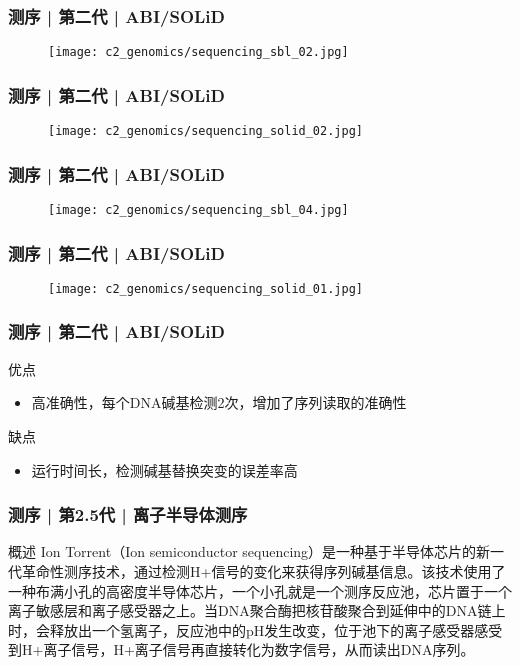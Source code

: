 \begin{frame}
  \frametitle{测序 | 第二代 | ABI/SOLiD}
  \begin{figure}
    \centering
    \texttt{[image: c2\_genomics/sequencing\_sbl\_02.jpg]}
  \end{figure}
\end{frame}

\begin{frame}
  \frametitle{测序 | 第二代 | ABI/SOLiD}
  \begin{figure}
    \centering
    \texttt{[image: c2\_genomics/sequencing\_solid\_02.jpg]}
  \end{figure}
\end{frame}

\begin{frame}
  \frametitle{测序 | 第二代 | ABI/SOLiD}
  \begin{figure}
    \centering
    \texttt{[image: c2\_genomics/sequencing\_sbl\_04.jpg]}
  \end{figure}
\end{frame}

\begin{frame}
  \frametitle{测序 | 第二代 | ABI/SOLiD}
  \begin{figure}
    \centering
    \texttt{[image: c2\_genomics/sequencing\_solid\_01.jpg]}
  \end{figure}
\end{frame}

\begin{frame}
  \frametitle{测序 | 第二代 | ABI/SOLiD}
  \begin{block}{优点}
    \begin{itemize}
      \item 高准确性，每个DNA碱基检测2次，增加了序列读取的准确性
    \end{itemize}
  \end{block}
  \pause
  \begin{block}{缺点}
    \begin{itemize}
      \item 运行时间长，检测碱基替换突变的误差率高
    \end{itemize}
  \end{block}
\end{frame}

\begin{frame}
  \frametitle{测序 | 第2.5代 | 离子半导体测序}
  \begin{block}{概述}
    Ion Torrent（Ion semiconductor sequencing）是一种基于半导体芯片的新一代革命性测序技术，通过检测H+信号的变化来获得序列碱基信息。该技术使用了一种布满小孔的高密度半导体芯片，一个小孔就是一个测序反应池，芯片置于一个离子敏感层和离子感受器之上。当DNA聚合酶把核苷酸聚合到延伸中的DNA链上时，会释放出一个氢离子，反应池中的pH发生改变，位于池下的离子感受器感受到H+离子信号，H+离子信号再直接转化为数字信号，从而读出DNA序列。
  \end{block}
\end{frame}

